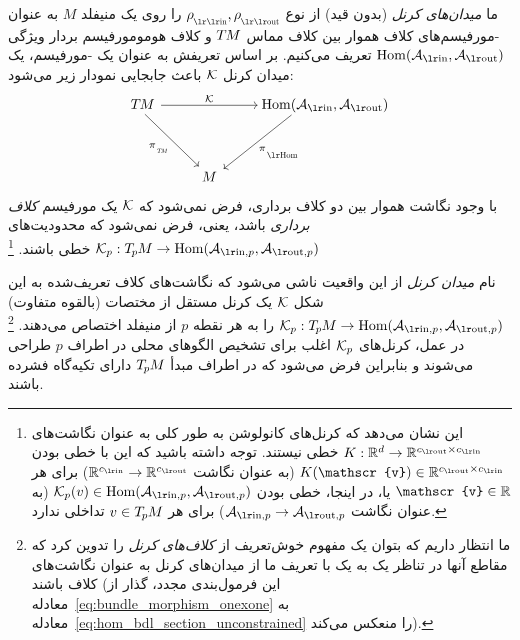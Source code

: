 \begin{dfn}
\label{dfn:kernel_field_general}
    ما \emph{میدان‌های کرنل} (بدون قید) از نوع $\rhoin,\rhoout$ را روی یک منیفلد $M$ به عنوان -مورفیسم‌های کلاف هموار بین کلاف مماس $T\mkern-1.5muM$ و کلاف هومومورفیسم بردار ویژگی $\Hom(\Ain,\Aout)$ تعریف می‌کنیم.
    بر اساس تعریفش به عنوان یک -مورفیسم، یک میدان کرنل $\mathcal{K}$ باعث جابجایی نمودار زیر می‌شود:
    \begin{equation}\label{eq:kernel_bundle_map}
        \begin{tikzcd}[row sep=3.5em, column sep=2.5em]
            \TM  \arrow[rd, start anchor={[xshift=-1ex]}, "\piTM"']
                \arrow[rr, "\K"]
            & &
            \mkern-3mu
            \Hom(\Ain,\Aout)
                \arrow[ld, start anchor={[xshift=-3ex]}, shorten >=.1ex, shorten <=-.75ex, "\piHom"] \\
            & M &
        \end{tikzcd}
    \end{equation}
    با وجود نگاشت هموار بین دو کلاف برداری، فرض نمی‌شود که $\mathcal{K}$ یک مورفیسم \emph{کلاف برداری} باشد، یعنی، فرض نمی‌شود که محدودیت‌های $\Kp: \TpM \to \Hom(\Ainp, \Aoutp)$ خطی باشند.%
    \footnote{
        این نشان می‌دهد که کرنل‌های کانولوشن به طور کلی به عنوان نگاشت‌های $K:\R^d \to \R^{\cout\times\cin}$ خطی نیستند.
        توجه داشته باشید که این با خطی بودن $K(\mathscr{v}) \in \R^{\cout\times\cin}$ (به عنوان نگاشت $\R^{\cin} \to \R^{\cout}$) برای هر $\mathscr{v}\in\R$ یا، در اینجا، خطی بودن $\Kp(v) \in \Hom(\Ainp,\Aoutp)$ (به عنوان نگاشت $\Ainp \to \Aoutp$) برای هر $v\in T_{\mkern-1.5mu p}\mkern-.5muM$ تداخلی ندارد.
    }
\end{dfn}
نام \emph{میدان کرنل} از این واقعیت ناشی می‌شود که نگاشت‌های کلاف تعریف‌شده به این شکل $\mathcal{K}$ یک کرنل مستقل از مختصات (بالقوه متفاوت) $\Kp: \TpM \to \Hom(\Ainp,\Aoutp)$ را به هر نقطه $p$ از منیفلد اختصاص می‌دهند.%
\footnote{
    ما انتظار داریم که بتوان یک مفهوم خوش‌تعریف از \emph{کلاف‌های کرنل} را تدوین کرد که مقاطع آنها در تناظر یک به یک با تعریف ما از میدان‌های کرنل به عنوان نگاشت‌های کلاف باشند (این فرمول‌بندی مجدد، گذار از معادله~\eqref{eq:bundle_morphism_onexone} به معادله~\eqref{eq:hom_bdl_section_unconstrained} را منعکس می‌کند).
}
در عمل، کرنل‌های $\mathcal{K}_p$ اغلب برای تشخیص الگوهای محلی در اطراف $p$ طراحی می‌شوند و بنابراین فرض می‌شود که در اطراف مبدأ $T_{\mkern-1.5mu p}\mkern-.5muM$ دارای تکیه‌گاه فشرده باشند.

